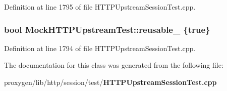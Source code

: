 Definition at line 1795 of file H\+T\+T\+P\+Upstream\+Session\+Test.\+cpp.

\subsubsection[{reusable\+\_\+}]{\setlength{\rightskip}{0pt plus 5cm}bool Mock\+H\+T\+T\+P\+Upstream\+Test\+::reusable\+\_\+ \{true\}}\label{classMockHTTPUpstreamTest_aad0b33fd958b633e0349a07c9b2cb3b9}


Definition at line 1794 of file H\+T\+T\+P\+Upstream\+Session\+Test.\+cpp.



The documentation for this class was generated from the following file\+:\begin{DoxyCompactItemize}
\item 
proxygen/lib/http/session/test/{\bf H\+T\+T\+P\+Upstream\+Session\+Test.\+cpp}\end{DoxyCompactItemize}

